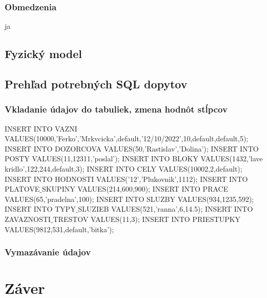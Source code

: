 \documentclass[slovak, 12pt, Times New Roman]{article}
\begin{document}
			\subsubsection{Obmedzenia}
				ja
		\subsection{Fyzický model}
		\subsection{Prehľad potrebných SQL dopytov}
			\subsubsection{Vkladanie údajov do tabuliek, zmena hodnôt stĺpcov}
				INSERT INTO VAZNI VALUES(10000,'Ferko','Mrkvcicka',default,'12/10/2022',10,default,default,5);
				INSERT INTO DOZORCOVA VALUES(50,'Rastislav','Dolina');
				INSERT INTO POSTY VALUES(11,12311,'poslal');
				INSERT INTO BLOKY VALUES(1432,'lave kridlo',122,244,default,3);
				INSERT INTO CELY VALUES(10002,2,default);
				INSERT INTO HODNOSTI VALUES('12','Plukovnik',1112);
				INSERT INTO PLATOVE$\_$SKUPINY VALUES(214,600,900);
				INSERT INTO PRACE VALUES(65,'pradelna',100);	
				INSERT INTO SLUZBY VALUES(934,1235,592);
				INSERT INTO TYPY$\_$SLUZIEB VALUES(521,'ranna',6,14.5);
				INSERT INTO ZAVAZNOSTI$\_$TRESTOV VALUES(11,3);
				INSERT INTO PRIESTUPKY VALUES(9812,531,default,'bitka');
			\subsubsection{Vymazávanie údajov}
	\section{Záver}
\end{document}
